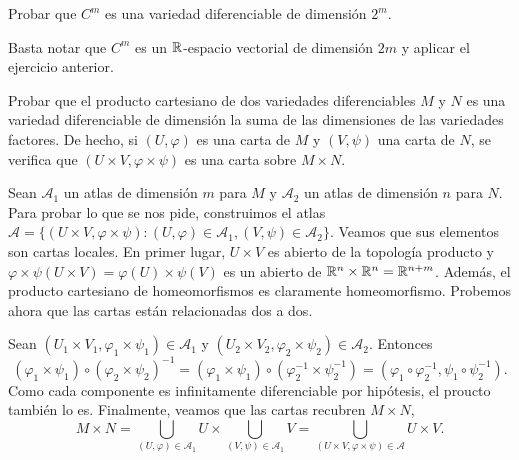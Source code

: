 \documentclass[twoside]{article}
\begin{document}
\begin{ejercicio}{6}
Probar que $C^m$ es una variedad diferenciable de dimensión $2^m$.
\end{ejercicio}
\begin{solucion}
Basta notar que $C^m$ es un $\mathbb{R}$-espacio vectorial de dimensión $2m$ y aplicar el ejercicio anterior.
\end{solucion}

\begin{ejercicio}{7}
Probar que el producto cartesiano de dos variedades diferenciables $M$ y $N$
es una variedad diferenciable de dimensión la suma de las dimensiones de
las variedades factores. De hecho, si $(U,\varphi)$ es una carta de $M$ y $(V,\psi )$ una
carta de $N$, se verifica que $(U \times V,\varphi\times\psi )$ es una carta sobre $M \times N$.
\end{ejercicio}
\begin{solucion}
Sean $\mathcal{A}_1$ un atlas de dimensión $m$ para $M$ y $\mathcal{A}_2$ un atlas de dimensión $n$ para $N$. Para probar lo que se nos pide, construimos el atlas $\mathcal{A}=\{(U\times V,\varphi\times\psi): (U,\varphi)\in\mathcal{A}_1, (V,\psi)\in\mathcal{A}_2\}$. Veamos que sus elementos son cartas locales. En primer lugar, $U\times V$ es abierto de la topología producto y $\varphi\times\psi(U\times V)=\varphi(U)\times\psi(V)$ es un abierto de $\mathbb{R}^n\times\mathbb{R}^n=\mathbb{R}^{n+m}$. Además, el producto cartesiano de homeomorfismos es claramente homeomorfismo. Probemos ahora que las cartas están relacionadas dos a dos. 

Sean $(U_1\times V_1,\varphi_1\times\psi_1)\in\mathcal{A}_1$ y $(U_2\times V_2,\varphi_2\times\psi_2)\in\mathcal{A}_2$. Entonces 
$$(\varphi_1\times\psi_1)\circ(\varphi_2\times\psi_2)^{-1}=(\varphi_1\times\psi_1)\circ(\varphi_2^{-1}\times\psi_2^{-1})=(\varphi_1\circ\varphi_2^{-1},\psi_1\circ\psi_2^{-1}).$$
Como cada componente es infinitamente diferenciable por hipótesis, el proucto también lo es. Finalmente, veamos que las cartas recubren $M\times N$,
$$M\times N= \bigcup_{(U,\varphi)\in\mathcal{A}_1}U\times\bigcup_{(V,\psi)\in\mathcal{A}_1}V=\bigcup_{(U\times V,\varphi\times\psi)\in\mathcal{A}}U\times V.$$
\end{solucion}
\end{document}
